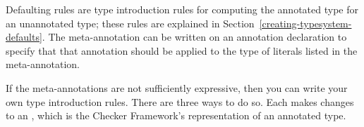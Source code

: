 Defaulting rules are type introduction rules for computing the annotated type for an unannotated type;
these rules are explained in Section~\ref{creating-typesystem-defaults}. The meta-annotation  can be written on an annotation
declaration to specify that that annotation should be applied to the type of literals listed in the
meta-annotation.


If the meta-annotations are not sufficiently expressive, then you
can write your own type introduction rules.  There are three ways to do so.
Each makes changes to an ,
which is the Checker Framework's representation of an annotated type.


